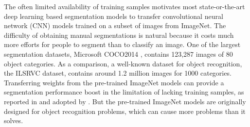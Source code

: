 
The often limited availability of training samples motivates most state-or-the-art deep learning based segmentation models \cite{long2015fully,chen2016deeplab,he2017mask} to transfer convolutional neural network (CNN) models \cite{krizhevsky2012imagenet,simonyan2014very,szegedy2015going,he2016deep} trained on a subset of images from ImageNet.
The difficulty of obtaining manual segmentations is natural because it costs much more efforts for people to segment than to classify an image.
One of the largest segmentation datasets, Microsoft COCO2014 \cite{lin2014microsoft}, contains 123,287 images of 80 object categories.
As a comparison, a well-known dataset for object recognition, the ILSRVC dataset\cite{russakovsky2015imagenet}, contains around 1.2 million images for  1000 categories.
Transferring weights from the pre-trained ImageNet models can provide a segmentation performance boost in the limitation of lacking training samples, as reported in \cite{long2015fully} and adopted by \cite{chen2016deeplab,he2017mask}.
But the pre-trained ImageNet models are originally designed for object recognition problems, which can cause more problems than it solves.


